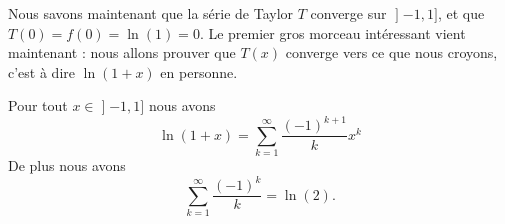 Nous savons maintenant que la série de Taylor \( T\) converge sur \( \mathopen] -1 , 1 \mathclose]\), et que \( T(0)=f(0)=\ln(1)=0\). Le premier gros morceau intéressant vient maintenant : nous allons prouver que \( T(x)\) converge vers ce que nous croyons, c'est à dire \( \ln(1+x)\) en personne.

\begin{proposition}     \label{PROPooKPBIooJdNsqX}
Pour tout \( x\in\mathopen] -1 , 1 \mathclose]\) nous avons
    \begin{equation}        \label{EqweEZnV}
        \ln(1+x)=\sum_{k=1}^{\infty}\frac{ (-1)^{k+1} }{ k }x^k
    \end{equation}
    De plus nous avons
    \begin{equation}    \label{EqKUQmOZ}
        \sum_{k=1}^{\infty}\frac{ (-1)^k }{ k }=\ln(2).
    \end{equation}
\end{proposition}

